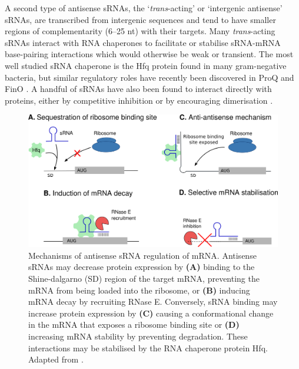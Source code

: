 A second type of antisense sRNAs, the ‘\textit{trans}-acting’ or ‘intergenic antisense’ sRNAs, are transcribed from intergenic sequences and tend to have smaller regions of complementarity (6--25 nt) with their targets. Many \textit{trans}-acting sRNAs interact with RNA chaperones to facilitate or stabilise sRNA-mRNA base-pairing interactions which would otherwise be weak or transient. The most well studied sRNA chaperone is the Hfq protein found in many gram-negative bacteria, but similar regulatory roles have recently been discovered in ProQ and FinO \citep{Attaiech2017-ip}. A handful of sRNAs have also been found to interact directly with proteins, either by competitive inhibition \citep{Babitzke2007-bb} or by encouraging dimerisation \citep{Duss2014-rs}.\par
\vspace{4mm}
\begin{figure}[H]
  \includegraphics[scale=0.8]{intro/lars_fig.png}
  \centering
  \caption[Mechanisms of antisense sRNA regulation of mRNA]{Mechanisms of antisense sRNA regulation of mRNA. Antisense sRNAs may decrease protein expression by \textbf{(A)} binding to the Shine-dalgarno (SD) region of the target mRNA, preventing the mRNA from being loaded into the ribosome, or \textbf{(B)} inducing mRNA decay by recruiting RNase E. Conversely, sRNA binding may increase protein expression by \textbf{(C)} causing a conformational change in the mRNA that exposes a ribosome binding site or \textbf{(D)} increasing mRNA stability by preventing degradation. These interactions may be stabilised by the RNA chaperone protein Hfq. Adapted from \cite{Barquist2015-pa}.}
  \label{fig:lars_fig.png}
\end{figure}

